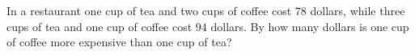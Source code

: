 In a restaurant one cup of tea and two cups of coffee cost $78$ dollars, while three cups of tea and one cup of coffee cost $94$ dollars. By how many dollars is one cup of coffee more expensive than one cup of tea?
